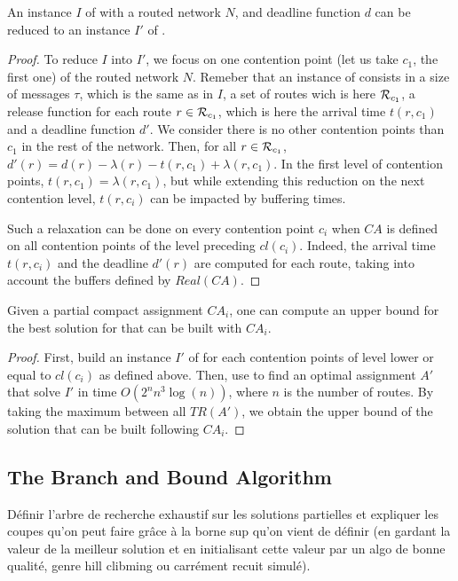 \begin{lemma}\label{lemma:reduce}
An instance $I$ of \spall with a routed network $N$, and deadline function $d$ can be reduced to an instance $I'$ of \wta. 
\end{lemma}
\begin{proof}
To reduce $I$ into $I'$, we focus on one contention point (let us take $c_1$, the first one) of the routed network $N$. Remeber that an instance of \wta consists in a size of messages $\tau$, which is the same as in $I$, a set of routes wich is here ${\cal R}_{c_1}$, a release function for each route $r \in {\cal R}_{c_1}$, which is here the arrival time $t(r,c_1)$ and a deadline function $d'$. 
We consider there is no other contention points than $c_1$ in the rest of the network. Then, for all $r \in {\cal R}_{c_1}$, $d'(r) = d(r) - \lambda(r) - t(r,c_1) + \lambda(r,c_1)$. In the first level of contention points, $t(r,c_1) = \lambda(r,c_1)$, but while extending this reduction on the next contention level, $t(r,c_i)$ can be impacted by buffering times.

Such a relaxation can be done on every contention point $c_i$ when $CA$ is defined on all contention points of the level preceding $cl(c_i)$. Indeed, the arrival time $t(r,c_i)$ and the deadline $d'(r)$ are computed for each route, taking into account the buffers defined by $Real(CA)$.
\end{proof}



\begin{lemma}\label{lemma:bound}
Given a partial compact assignment $CA_i$, one can compute an upper bound for the best solution for \spall that can be built with $CA_i$.
\end{lemma} 
\begin{proof}First, build an instance $I'$ of \wta for each contention points of level lower or equal to $cl(c_i)$ as defined above. Then, use \ASPMLS to find an optimal assignment $A'$ that solve $I'$ in time $O(2^nn^3\log(n))$, where $n$ is the number of routes. By taking the maximum between all $TR(A')$, we obtain the upper bound of the solution that can be built following $CA_i$.
\end{proof}

\subsection{The Branch and Bound Algorithm}\label{sec:branchBound}
Définir l'arbre de recherche exhaustif sur les solutions partielles et expliquer les coupes
qu'on peut faire grâce à la borne sup qu'on vient de définir (en gardant la valeur de la meilleur solution
et en initialisant cette valeur par un algo de bonne qualité, genre hill clibming ou carrément recuit simulé).


